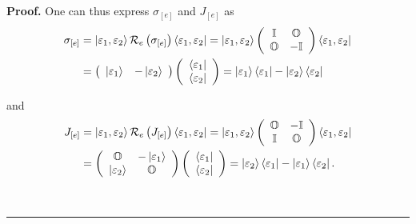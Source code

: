 \documentclass[aps,preprint]{revtex4}
\newenvironment{proof}[1][Proof]{\noindent\textbf{#1.} }{\ \rule{0.5em}{0.5em}}
\begin{document}
\begin{proof}
One can thus express $\sigma_{\left[ e\right] }$ and $J_{\left[ e\right] }$
as%
\begin{align}
\sigma_{\left[ e\right] } & =\left\vert \mathbf{\varepsilon}_{1},\mathbf{%
\varepsilon}_{2}\right\rangle \mathcal{R}_{e}\left( \sigma_{\left[ e\right]
}\right) \left\langle \mathbf{\varepsilon}_{1},\mathbf{\varepsilon}%
_{2}\right\vert =\left\vert \mathbf{\varepsilon}_{1},\mathbf{\varepsilon}%
_{2}\right\rangle \left( 
\begin{array}{cc}
\mathbb{I} & \mathbb{O} \\ 
\mathbb{O} & -\mathbb{I}%
\end{array}
\right) \left\langle \mathbf{\varepsilon}_{1},\mathbf{\varepsilon}%
_{2}\right\vert \\
& =\left( 
\begin{array}{cc}
\left\vert \mathbf{\varepsilon}_{1}\right\rangle & -\left\vert \mathbf{%
\varepsilon}_{2}\right\rangle%
\end{array}
\right) \left( 
\begin{array}{c}
\left\langle \mathbf{\varepsilon}_{1}\right\vert \\ 
\left\langle \mathbf{\varepsilon}_{2}\right\vert%
\end{array}
\right) =\left\vert \mathbf{\varepsilon}_{1}\right\rangle \left\langle 
\mathbf{\varepsilon}_{1}\right\vert -\left\vert \mathbf{\varepsilon}%
_{2}\right\rangle \left\langle \mathbf{\varepsilon}_{2}\right\vert
\end{align}

and%
\begin{align}
J_{\left[ e\right] } & =\left\vert \mathbf{\varepsilon}_{1},\mathbf{%
\varepsilon}_{2}\right\rangle \mathcal{R}_{e}\left( J_{\left[ e\right]
}\right) \left\langle \mathbf{\varepsilon}_{1},\mathbf{\varepsilon }%
_{2}\right\vert =\left\vert \mathbf{\varepsilon}_{1},\mathbf{\varepsilon}%
_{2}\right\rangle \left( 
\begin{array}{cc}
\mathbb{O} & -\mathbb{I} \\ 
\mathbb{I} & \mathbb{O}%
\end{array}
\right) \left\langle \mathbf{\varepsilon}_{1},\mathbf{\varepsilon}%
_{2}\right\vert \\
& =\left( 
\begin{array}{cc}
\mathbb{O} & -\left\vert \mathbf{\varepsilon}_{1}\right\rangle \\ 
\left\vert \mathbf{\varepsilon}_{2}\right\rangle & \mathbb{O}%
\end{array}
\right) \left( 
\begin{array}{c}
\left\langle \mathbf{\varepsilon}_{1}\right\vert \\ 
\left\langle \mathbf{\varepsilon}_{2}\right\vert%
\end{array}
\right) =\left\vert \mathbf{\varepsilon}_{2}\right\rangle \left\langle 
\mathbf{\varepsilon}_{1}\right\vert -\left\vert \mathbf{\varepsilon}%
_{1}\right\rangle \left\langle \mathbf{\varepsilon}_{2}\right\vert .
\end{align}


\end{proof}
\end{document}
